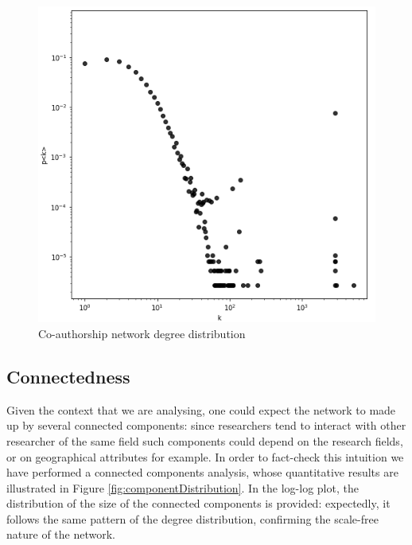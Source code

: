 \documentclass[sigchi]{acmart}
\begin{document}
\begin{figure}[h]
  \centering
  \includegraphics[width=\linewidth]{report/img/degreeDistribution.png}
  \caption{Co-authorship network degree distribution}
  \label{fig:degreeDistribution}
\end{figure}

\subsection{Connectedness}
Given the context that we are analysing, one could expect the network to made up by several connected components: since researchers tend to interact with other researcher of the same field such components could depend on the research fields, or on geographical attributes for example. In order to fact-check this intuition we have performed a connected components analysis, whose quantitative results are illustrated in Figure \ref{fig:componentDistribution}. In the log-log plot, the distribution of the size of the connected components is provided: expectedly, it follows the same pattern of the degree distribution, confirming the scale-free nature of the network.
\end{document}
